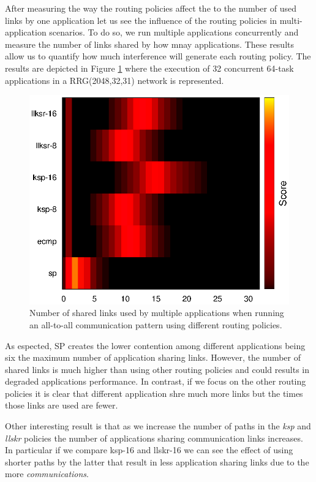 \documentclass{sig-alternate}
\begin{document}
After measuring the way the routing policies affect the to the number of used links by one application let us see the influence of the routing policies in multi-application scenarios. To do so, we run multiple applications concurrently and measure the number of links shared by how mnay applications. These results allow us to quantify how much interference will generate each routing policy. The results are depicted in Figure \ref{fig:link_usage_multiapp} where the execution of 32 concurrent 64-task applications in a RRG(2048,32,31) network is represented.   

\begin{figure}[h]
    \centering 
    \includegraphics[width=\linewidth]{data/nlinks_used/graph_multiapp_all2all.eps}
    \caption{Number of shared links used by multiple applications when running an all-to-all communication pattern using different routing policies.}
    \label{fig:link_usage_multiapp}
\end{figure}

As espected, SP creates the lower contention among different applications being six the maximum number of application sharing links. However, the number of shared links is much higher than using other routing policies and could results in degraded applications performance. In contrast, if we focus on the other routing policies it is clear that different application shre much more links but the times those links are used are fewer. 

Other interesting result is that as we increase the number of paths in the \textit{ksp} and \textit{llskr} policies the number of applications sharing communication links increases. In particular if we compare ksp-16 and llskr-16 we can see the effect of using shorter paths by the latter that result in less application sharing links due to the more \textit{communications}. 
\end{document}
